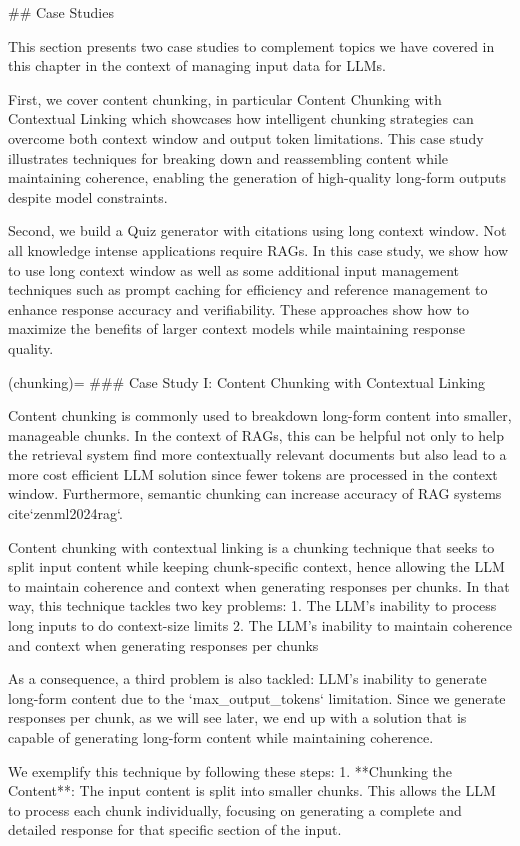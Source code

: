 {{## Case Studies

This section presents two case studies to complement topics we have covered in this chapter in the context of managing input data for LLMs.

First, we cover content chunking, in particular Content Chunking with Contextual Linking which showcases how intelligent chunking strategies can overcome both context window and output token limitations. This case study illustrates techniques for breaking down and reassembling content while maintaining coherence, enabling the generation of high-quality long-form outputs despite model constraints.

Second, we build a Quiz generator with citations using long context window. Not all knowledge intense applications require RAGs. In this case study, we show how to use long context window as well as some additional input management techniques such as prompt caching for efficiency and reference management to enhance response accuracy and verifiability. These approaches show how to maximize the benefits of larger context models while maintaining response quality.

(chunking)=
### Case Study I: Content Chunking with Contextual Linking

Content chunking is commonly used to breakdown long-form content into smaller, manageable chunks. In the context of RAGs, this can be helpful not only to help the retrieval system find more contextually relevant documents but also lead to a more cost efficient LLM solution since fewer tokens are processed in the context window. Furthermore, semantic chunking can increase accuracy of RAG systems {cite}`zenml2024rag`.

Content chunking with contextual linking is a chunking technique that seeks to split input content while keeping chunk-specific context, hence allowing the LLM to maintain coherence and context when generating responses per chunks. In that way, this technique tackles two key problems:
1. The LLM's inability to process long inputs to do context-size limits
2. The LLM's inability to maintain coherence and context when generating responses per chunks

As a consequence, a third problem is also tackled: LLM's inability to generate long-form content due to the `max_output_tokens` limitation. Since we generate responses per chunk, as we will see later, we end up with a solution that is capable of generating long-form content while maintaining coherence.

We exemplify this technique by following these steps:
1. **Chunking the Content**: The input content is split into smaller chunks. This allows the LLM to process each chunk individually, focusing on generating a complete and detailed response for that specific section of the input.

}}

